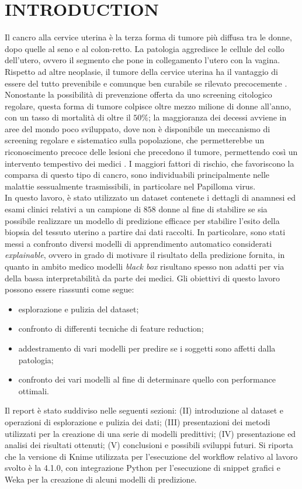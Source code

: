 \section{INTRODUCTION}
Il cancro alla cervice uterina è la terza forma di tumore più diffusa tra le donne, dopo quelle al seno e al colon-retto. La patologia aggredisce le cellule del collo dell’utero, ovvero il segmento che pone in collegamento l’utero con la vagina. Rispetto ad altre neoplasie, il tumore della cervice uterina ha il vantaggio di essere del tutto prevenibile e comunque ben curabile se rilevato precocemente \cite{veronesi}.
Nonostante la possibilità di prevenzione offerta da uno screening citologico regolare, questa forma di tumore colpisce oltre mezzo milione di donne all'anno, con un tasso di mortalità di oltre il $50\%$; la maggioranza dei decessi avviene in aree del mondo poco sviluppato, dove non è disponibile un meccanismo di screening regolare e sistematico sulla popolazione, che permetterebbe un riconoscimento precoce delle lesioni che precedono il tumore, permettendo così un intervento tempestivo dei medici \cite{paper}.
I maggiori fattori di rischio, che favoriscono la comparsa di questo tipo di cancro, sono individuabili principalmente nelle malattie sessualmente trasmissibili, in particolare nel Papilloma virus.\\
In questo lavoro, è stato utilizzato un dataset contenete i dettagli di anamnesi ed esami clinici relativi a un campione di $858$ donne al fine di stabilire se sia possibile realizzare un modello di predizione efficace per stabilire l'esito della biopsia del tessuto uterino a partire dai dati raccolti.
In particolare, sono stati messi a confronto diversi modelli di apprendimento automatico considerati \textit{explainable}, ovvero in grado di motivare il risultato della predizione fornita, in quanto in ambito medico modelli \textit{black box} risultano spesso non adatti per via della bassa interpretabilità da parte dei medici.
Gli obiettivi di questo lavoro possono essere riassunti come segue:
\begin{itemize}
	\item esplorazione e pulizia del dataset;
	\item confronto di differenti tecniche di feature reduction;
	\item addestramento di vari modelli per predire se i soggetti sono affetti dalla patologia;
	\item confronto dei vari modelli al fine di determinare quello con performance ottimali.
\end{itemize}
Il report è stato suddiviso nelle seguenti sezioni: (II) introduzione al dataset e operazioni di esplorazione e pulizia dei dati; (III) presentazioni dei metodi utilizzati per la creazione di una serie di modelli predittivi; (IV) presentazione ed analisi dei risultati ottenuti; (V) conclusioni e possibili sviluppi futuri.
Si riporta che la versione di Knime utilizzata per l'esecuzione del workflow relativo al lavoro svolto è la 4.1.0, con integrazione Python per l'esecuzione di snippet grafici e Weka per la creazione di alcuni modelli di predizione. 